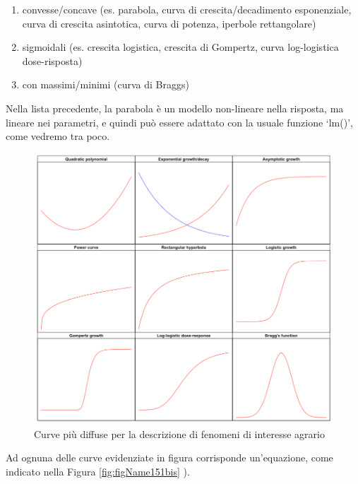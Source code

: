 \documentclass[a4paper,12pt,oneside]{book}
\providecommand{\tightlist}{%
  \setlength{\itemsep}{0pt}\setlength{\parskip}{0pt}}
\begin{document}
\begin{enumerate}
\def\labelenumi{\arabic{enumi}.}
\tightlist
\item
  convesse/concave (es. parabola, curva di crescita/decadimento esponenziale, curva di crescita asintotica, curva di potenza, iperbole rettangolare)
\item
  sigmoidali (es. crescita logistica, crescita di Gompertz, curva log-logistica dose-risposta)
\item
  con massimi/minimi (curva di Braggs)
\end{enumerate}

Nella lista precedente, la parabola è un modello non-lineare nella risposta, ma lineare nei parametri, e quindi può essere adattato con la usuale funzione `lm()', come vedremo tra poco.

\begin{figure}

{\centering \includegraphics[width=0.95\linewidth]{_images/nonLinearCurves} 

}

\caption{Curve più diffuse per la descrizione di fenomeni di interesse agrario}\label{fig:figName151b}
\end{figure}

Ad ognuna delle curve evidenziate in figura corrisponde un'equazione, come indicato nella Figura \ref{fig:figName151bis} ).
\end{document}
